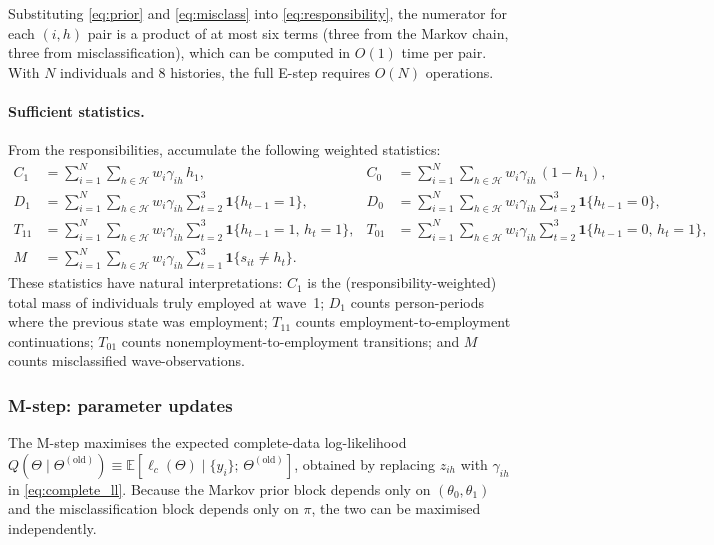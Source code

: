 Substituting \eqref{eq:prior} and \eqref{eq:misclass} into
\eqref{eq:responsibility}, the numerator for each \((i, h)\) pair is a
product of at most six terms (three from the Markov chain, three from
misclassification), which can be computed in \(O(1)\) time per pair.
With \(N\) individuals and 8 histories, the full E-step requires
\(O(N)\) operations.

\paragraph{Sufficient statistics.}
From the responsibilities, accumulate the following weighted statistics:
\begin{align}
C_1 &= \sum_{i=1}^{N} \sum_{h \in \mathcal{H}} w_i \gamma_{ih}\, h_1,
  &C_0 &= \sum_{i=1}^{N} \sum_{h \in \mathcal{H}} w_i \gamma_{ih}\,(1 - h_1),
  \label{eq:suff_C} \\[4pt]
D_1 &= \sum_{i=1}^{N} \sum_{h \in \mathcal{H}} w_i \gamma_{ih}
  \sum_{t=2}^{3} \mathbf{1}\{h_{t-1} = 1\},
  &D_0 &= \sum_{i=1}^{N} \sum_{h \in \mathcal{H}} w_i \gamma_{ih}
  \sum_{t=2}^{3} \mathbf{1}\{h_{t-1} = 0\},
  \label{eq:suff_D} \\[4pt]
T_{11} &= \sum_{i=1}^{N} \sum_{h \in \mathcal{H}} w_i \gamma_{ih}
  \sum_{t=2}^{3} \mathbf{1}\{h_{t-1} = 1,\, h_t = 1\},
  &T_{01} &= \sum_{i=1}^{N} \sum_{h \in \mathcal{H}} w_i \gamma_{ih}
  \sum_{t=2}^{3} \mathbf{1}\{h_{t-1} = 0,\, h_t = 1\},
  \label{eq:suff_T} \\[4pt]
M &= \sum_{i=1}^{N} \sum_{h \in \mathcal{H}} w_i \gamma_{ih}
  \sum_{t=1}^{3} \mathbf{1}\{s_{it} \neq h_t\}.
  \label{eq:suff_M}
\end{align}
These statistics have natural interpretations: \(C_1\) is the
(responsibility-weighted) total mass of individuals truly employed at
wave~1; \(D_1\) counts person-periods where the previous state was
employment; \(T_{11}\) counts employment-to-employment continuations;
\(T_{01}\) counts nonemployment-to-employment transitions; and \(M\)
counts misclassified wave-observations.

\subsubsection{M-step: parameter updates}
\label{sec:mstep}

The M-step maximises the expected complete-data log-likelihood
\(Q(\Theta \mid \Theta^{(\text{old})}) \equiv
\mathbb{E}[\ell_c(\Theta) \mid \{y_i\};\, \Theta^{(\text{old})}]\),
obtained by replacing \(z_{ih}\) with \(\gamma_{ih}\) in
\eqref{eq:complete_ll}. Because the Markov prior block depends only on
\((\theta_0, \theta_1)\) and the misclassification block depends only on
\(\pi\), the two can be maximised independently.

